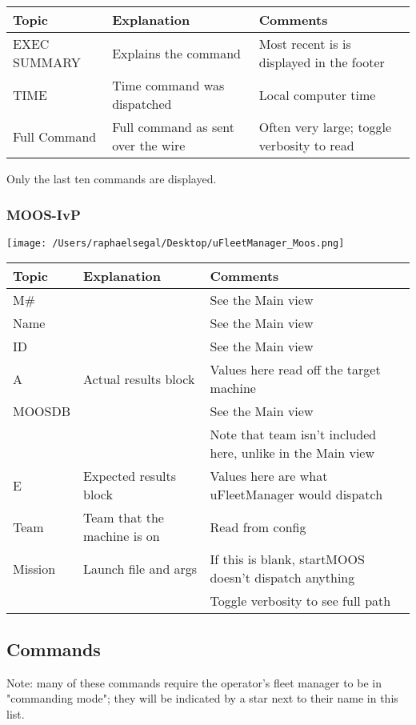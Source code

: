 \documentclass[11pt]{article}
\begin{document}
\begin{tabular}{l|ll}
Topic & Explanation & Comments\\
\hline
EXEC SUMMARY & Explains the command & Most recent is is displayed in the footer\\
TIME & Time command was dispatched & Local computer time\\
Full Command & Full command as sent over the wire & Often very large; toggle verbosity to read
\end{tabular}

Only the last ten commands are displayed. 
\subsubsection{MOOS-IvP}
\texttt{[image: /Users/raphaelsegal/Desktop/uFleetManager\_Moos.png]}

\begin{tabular}{l|ll}
Topic & Explanation & Comments\\
\hline
M\# && See the Main view\\
Name && See the Main view\\
ID && See the Main view\\
A & Actual results block & Values here read off the target machine\\
MOOSDB && See the Main view\\&&Note that team isn't included here, unlike in the Main view\\
E & Expected results block & Values here are what uFleetManager would dispatch\\
Team & Team that the machine is on & Read from config\\
Mission & Launch file and args & If this is blank, startMOOS doesn't dispatch anything\\ && Toggle verbosity to see full path\\

\end{tabular}
\subsection{Commands}
Note: many of these commands require the operator's fleet manager to be in "commanding mode"; they will be indicated by a star next to their name in this list.
\end{document}
